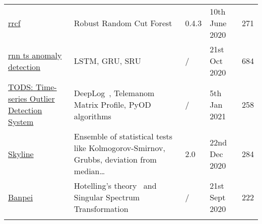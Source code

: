 \begin{table}[h]
{\begin{tabular}{lllll}
            \href{https://github.com/kLabUM/rrcf}{rrcf}                                                             & Robust Random Cut Forest~\cite{Guha.2016}                                                                                                                                                                                                                                                                                                                                                                                     & 0.4.3     & 10th June 2020    & 271   \\\addlinespace 
            \href{https://github.com/chickenbestlover/RNN-Time-series-Anomaly-Detection}{rnn ts anomaly detection}  & LSTM, GRU, SRU                                                                                                                                                                                                                                                                                                                                                                                                                & /         & 21st Oct 2020     & 684   \\\addlinespace 
            \href{https://github.com/datamllab/tods}{TODS: Time-series Outlier Detection System}                    & DeepLog~\cite{Du.2017}, Telemanom Matrix Profile, PyOD algorithms                                                                                                                                                                                                                                                                                                                                                             & /         & 5th Jan 2021      & 258   \\\addlinespace
            \href{https://github.com/earthgecko/skyline}{Skyline}                                                   & Ensemble of statistical tests like Kolmogorov-Smirnov, Grubbs, deviation from median\ldots                                                                                                                                                                                                                                                                                                                                    & 2.0       & 22nd Dec 2020     & 284   \\\addlinespace
            \href{https://github.com/tsurubee/banpei}{Banpei}                                                       & Hotelling's theory~\cite{Hotelling.1990} and Singular Spectrum Transformation                                                                                                                                                                                                                                                                                                                                                 & /         & 21st Sept 2020    & 222   \\\addlinespace

\end{tabular}}
\end{table}
